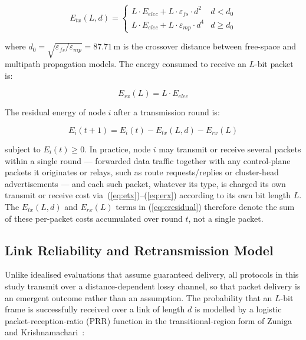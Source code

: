 \documentclass[12pt]{article}
\begin{document}
\begin{equation}
E_{tx}(L, d) = \begin{cases}
L \cdot E_{elec} + L \cdot \varepsilon_{fs} \cdot d^2 & d < d_0 \\
L \cdot E_{elec} + L \cdot \varepsilon_{mp} \cdot d^4 & d \geq d_0
\end{cases}
\label{eq:etx}
\end{equation}

where $d_0 = \sqrt{\varepsilon_{fs} / \varepsilon_{mp}} = 87.71$\,m
is the crossover distance between free-space and multipath propagation
models. The energy consumed to receive an $L$-bit packet is:

\begin{equation}
E_{rx}(L) = L \cdot E_{elec}
\label{eq:erx}
\end{equation}

The residual energy of node $i$ after a transmission round is:

\begin{equation}
E_i(t+1) = E_i(t) - E_{tx}(L, d) - E_{rx}(L)
\label{eq:eresidual}
\end{equation}

subject to $E_i(t) \geq 0$. In practice, node $i$ may transmit or
receive several packets within a single round --- forwarded data
traffic together with any control-plane packets it originates or
relays, such as route requests/replies or cluster-head advertisements
--- and each such packet, whatever its type, is charged its own
transmit or receive cost via~(\ref{eq:etx})--(\ref{eq:erx}) according
to its own bit length $L$. The $E_{tx}(L, d)$ and $E_{rx}(L)$ terms in
(\ref{eq:eresidual}) therefore denote the sum of these per-packet
costs accumulated over round $t$, not a single packet.

\subsection{Link Reliability and Retransmission Model}

Unlike idealised evaluations that assume guaranteed delivery, all
protocols in this study transmit over a distance-dependent lossy
channel, so that packet delivery is an emergent outcome rather than
an assumption. The probability that an $L$-bit frame is successfully
received over a link of length $d$ is modelled by a logistic
packet-reception-ratio (PRR) function in the transitional-region
form of Zuniga and Krishnamachari~\cite{zuniga2004}:
\end{document}
